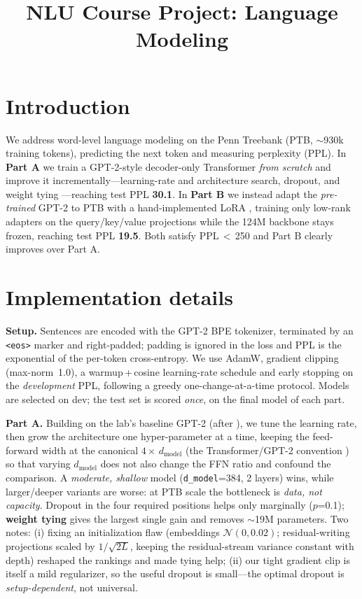 \documentclass[a4paper]{article}
\title{NLU Course Project: Language Modeling}
\begin{document}
\maketitle

\section{Introduction}
We address word-level language modeling on the Penn Treebank (PTB, $\sim$930k
training tokens), predicting the next token and measuring perplexity (PPL). In
\textbf{Part A} we train a GPT-2-style decoder-only Transformer \emph{from scratch}
and improve it incrementally---learning-rate and architecture search, dropout, and
weight tying \cite{press2017tying}---reaching test PPL \textbf{30.1}. In
\textbf{Part B} we instead adapt the \emph{pre-trained} GPT-2 to PTB with a
hand-implemented LoRA \cite{hu2022lora}, training only low-rank adapters on the
query/key/value projections while the 124M backbone stays frozen, reaching test PPL
\textbf{19.5}. Both satisfy PPL\,$<$\,250 and Part B clearly improves over Part A.

\section{Implementation details}
\textbf{Setup.} Sentences are encoded with the GPT-2 BPE tokenizer, terminated by an
\texttt{<eos>} marker and right-padded; padding is ignored in the loss and PPL is the
exponential of the per-token cross-entropy. We use AdamW, gradient clipping
(max-norm~1.0), a warmup\,+\,cosine learning-rate schedule and early stopping on the
\emph{development} PPL, following a greedy one-change-at-a-time protocol. Models are
selected on dev; the test set is scored \emph{once}, on the final model of each part.

\textbf{Part A.} Building on the lab's baseline GPT-2 (after \cite{karpathy_mingpt}),
we tune the learning rate, then grow the architecture one hyper-parameter at a time,
keeping the feed-forward width at the canonical $4{\times}\,d_{\text{model}}$
(the Transformer/GPT-2 convention \cite{vaswani2017attention}) so that varying
$d_{\text{model}}$ does not also change the FFN ratio and confound the comparison. A
\emph{moderate, shallow} model (\texttt{d\_model}=384, 2 layers) wins, while
larger/deeper variants are worse: at PTB scale the bottleneck is \emph{data, not
capacity}. Dropout in the four required positions helps only marginally ($p$=0.1);
\textbf{weight tying} \cite{press2017tying} gives the largest single gain and removes
$\sim$19M parameters. Two notes: (i) fixing an initialization flaw (embeddings
$\mathcal{N}(0,0.02)$; residual-writing projections scaled by $1/\sqrt{2L}$, keeping
the residual-stream variance constant with depth) reshaped the rankings and made tying
help; (ii) our tight gradient clip is itself a mild regularizer, so the useful dropout
is small---the optimal dropout is \emph{setup-dependent}, not universal.
\end{document}

